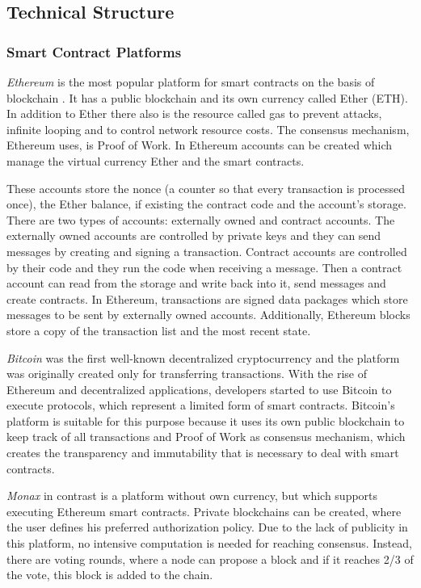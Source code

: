 \documentclass[conference]{IEEEtran}
\begin{document}
\subsection{Technical Structure}

\subsubsection{Smart Contract Platforms}
\textit{Ethereum} is the most popular platform for smart contracts on the basis of blockchain \cite{Meitinger2017}. It has a public blockchain and its own currency called Ether (ETH). In addition to Ether there also is the resource called gas to prevent attacks, infinite looping and to control network resource costs. The consensus mechanism, Ethereum uses, is Proof of Work. In Ethereum accounts can be created which manage the virtual currency Ether and the smart contracts. \cite{Bartoletti2017} \cite{Zhang2016} \par 
These accounts store the nonce (a counter so that every transaction is processed once), the Ether balance, if existing the contract code and the account's storage. There are two types of accounts: externally owned and contract accounts. The externally owned accounts are controlled by private keys and they can send messages by creating and signing a transaction. Contract accounts are controlled by their code and they run the code when receiving a message. Then a contract account can read from the storage and write back into it, send messages and create contracts. In Ethereum, transactions are signed data packages which store messages to be sent by externally owned accounts. Additionally, Ethereum blocks store a copy of the transaction list and the most recent state. \cite{Buterin2014}  \par
\textit{Bitcoin} was the first well-known decentralized cryptocurrency and the platform was originally created only for transferring transactions. With the rise of Ethereum and decentralized applications, developers started to use Bitcoin to execute protocols, which represent a limited form of smart contracts. Bitcoin's platform is suitable for this purpose because it uses its own public blockchain to keep track of all transactions and Proof of Work as consensus mechanism, which creates the transparency and immutability that is necessary to deal with smart contracts. \cite{Bartoletti2017} \par 
\textit{Monax} in contrast is a platform without own currency, but which supports executing Ethereum smart contracts. Private blockchains can be created, where the user defines his preferred authorization policy. Due to the lack of publicity in this platform, no intensive computation is needed for reaching consensus. Instead, there are voting rounds, where a node can propose a block and if it reaches 2/3 of the vote, this block is added to the chain. \cite{Bartoletti2017} \par 
\end{document}
